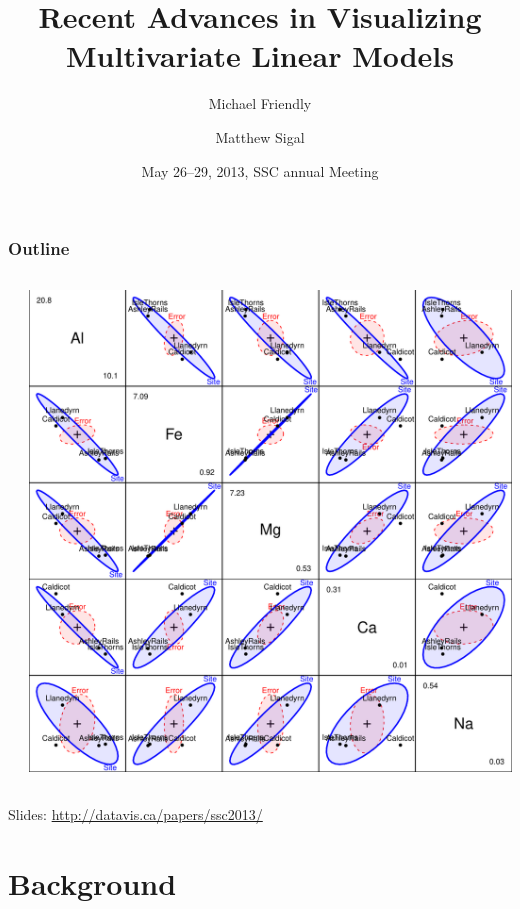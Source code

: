 \documentclass[10pt,t]{beamer}
\title{\small{Recent Advances in Visualizing Multivariate Linear Models}}
\author[Friendly, Sigal]{Michael Friendly \and Matthew Sigal}
\date[SSC] %
{May 26--29, 2013, SSC annual Meeting}
\begin{document}
\begin{frame}
\titlepage
\end{frame}

\begin{frame}
  \frametitle{Outline}
	\begin{columns}[c]
	  \begin{column}{.6\textwidth}
	  \tableofcontents
	  \end{column}
	  \begin{column}{.4\textwidth}
	  \includegraphics[width=\textwidth]{figures/pottery-HE3}
	  \end{column}
	\end{columns}
	\begin{center}
	  Slides: \url{http://datavis.ca/papers/ssc2013/}
	\end{center}
\end{frame}

\section{Background}
\end{document}
